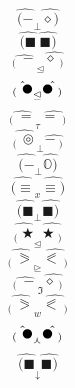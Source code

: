 \documentclass[12pt]{article}
\begin{document}
\begin{multicols}{5}
$$\hat{(-} _\bot \hat{\diamond)}$$
$$\hat{(\blacksquare} \  \hat{\blacksquare)}$$
$$\hat{_( \ -} _\trianglelefteq \hat{\diamond\ _)}$$
$$\hat{_( \ \newmoon} _\trianglelefteq \hat{\newmoon\ _)}$$
$$\hat{_( \ =} _\tau \hat{=\ _)}$$
$$\hat{_( \ \circledcirc} _\bot \hat{-\ _)}$$
$$\hat{(-} _\bot \hat{\mathbb{O})}$$
$$\hat{(\equiv} _x \hat{\equiv)}$$
$$\hat{(\blacksquare} _\bot \hat{\blacksquare)}$$
$$\hat{_( \ \bigstar} _\trianglelefteq \hat{\bigstar\ _)}$$
$$\hat{_( \ \eqslantgtr} _\trianglerighteq \hat{\eqslantless\ _)}$$
$$\hat{_( \ -} _\mathfrak{I} \hat{\diamond\ _)}$$
$$\hat{_( \ \eqslantgtr} _w \hat{\eqslantless\ _)}$$
$$\hat{_( \ \newmoon} _\curlywedge \hat{\newmoon\ _)}$$
$$\hat{(\blacksquare} _\downarrow \hat{\blacksquare)}$$
\end{multicols}
\end{document}

